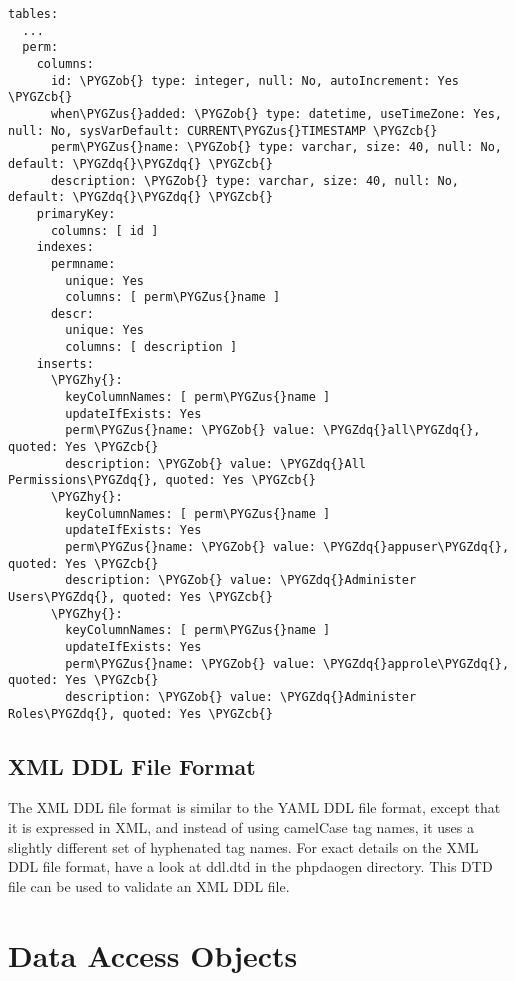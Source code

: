 \documentclass[letterpaper,10pt,english]{sphinxmanual}
\def\PYGZus{\char`\_}
\def\PYGZob{\char`\{}
\def\PYGZcb{\char`\}}
\def\PYGZhy{\char`\-}
\def\PYGZdq{\char`\"}
\begin{document}
\begin{Verbatim}[commandchars=\\\{\}]
tables:
  ...
  perm:
    columns:
      id: \PYGZob{} type: integer, null: No, autoIncrement: Yes \PYGZcb{}
      when\PYGZus{}added: \PYGZob{} type: datetime, useTimeZone: Yes, null: No, sysVarDefault: CURRENT\PYGZus{}TIMESTAMP \PYGZcb{}
      perm\PYGZus{}name: \PYGZob{} type: varchar, size: 40, null: No, default: \PYGZdq{}\PYGZdq{} \PYGZcb{}
      description: \PYGZob{} type: varchar, size: 40, null: No, default: \PYGZdq{}\PYGZdq{} \PYGZcb{}
    primaryKey:
      columns: [ id ]
    indexes:
      permname:
        unique: Yes
        columns: [ perm\PYGZus{}name ]
      descr:
        unique: Yes
        columns: [ description ]
    inserts:
      \PYGZhy{}:
        keyColumnNames: [ perm\PYGZus{}name ]
        updateIfExists: Yes
        perm\PYGZus{}name: \PYGZob{} value: \PYGZdq{}all\PYGZdq{}, quoted: Yes \PYGZcb{}
        description: \PYGZob{} value: \PYGZdq{}All Permissions\PYGZdq{}, quoted: Yes \PYGZcb{}
      \PYGZhy{}:
        keyColumnNames: [ perm\PYGZus{}name ]
        updateIfExists: Yes
        perm\PYGZus{}name: \PYGZob{} value: \PYGZdq{}appuser\PYGZdq{}, quoted: Yes \PYGZcb{}
        description: \PYGZob{} value: \PYGZdq{}Administer Users\PYGZdq{}, quoted: Yes \PYGZcb{}
      \PYGZhy{}:
        keyColumnNames: [ perm\PYGZus{}name ]
        updateIfExists: Yes
        perm\PYGZus{}name: \PYGZob{} value: \PYGZdq{}approle\PYGZdq{}, quoted: Yes \PYGZcb{}
        description: \PYGZob{} value: \PYGZdq{}Administer Roles\PYGZdq{}, quoted: Yes \PYGZcb{}
\end{Verbatim}


\subsection{XML DDL File Format}
\label{jaxFrameworkGuide:xml-ddl-file-format}
The XML DDL file format is similar to the YAML DDL file format, except that it is expressed in XML,
and instead of using camelCase tag names, it uses a slightly different set of hyphenated tag names.
For exact details on the XML DDL file format, have a look at ddl.dtd in the phpdaogen directory.
This DTD file can be used to validate an XML DDL file.


\section{Data Access Objects}
\label{jaxFrameworkGuide:data-access-objects}
\end{document}
